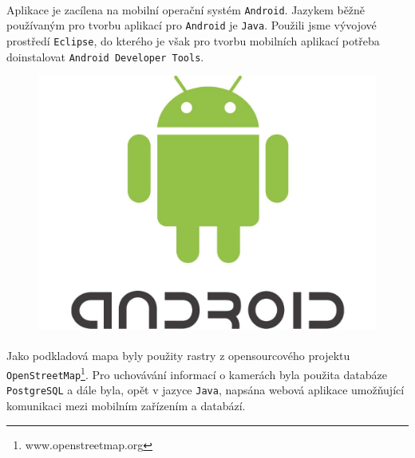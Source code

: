 \paragraph{}
Aplikace je zacílena na mobilní operační systém \texttt{Android}. Jazykem běžně používaným pro tvorbu aplikací pro \texttt{Android} je \texttt{Java}. Použili jsme vývojové prostředí \texttt{Eclipse}, do kterého je však pro tvorbu mobilních aplikací potřeba doinstalovat \texttt{Android Developer Tools}.
\begin{figure}[hb]
\begin{center}
\includegraphics[scale=0.1]{pics/android.jpg}
\end{center}
\end{figure} 
\paragraph{}
Jako podkladová mapa byly použity rastry z opensourcového projektu \texttt{OpenStreetMap}\footnote{www.openstreetmap.org}. Pro uchovávání informací o kamerách byla použita databáze \texttt{PostgreSQL} a dále byla, opět v jazyce \texttt{Java}, napsána webová aplikace umož\v{n}ující komunikaci mezi mobilním zařízením a databází.